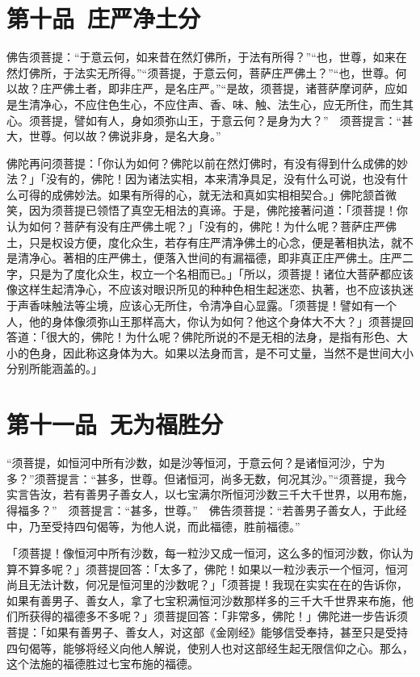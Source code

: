 \documentclass[12pt,twoside,openany]{book}
\newcommand{\kai}[1]{{\CJKfamily{kai}#1}}
\begin{document}
\chapter{第十品\ 庄严净土分}
\begin{pinyinscope}
佛告须菩提：“于意云何，如来昔在然灯佛所，于法有所得？”“也，世尊，如来在然灯佛所，于法实无所得。”“须菩提，于意云何，菩萨庄严佛土？”“也，世尊。何以故？庄严佛土者，即非庄严，是名庄严。”“是故，须菩提，诸菩萨摩诃萨，应如是生清净心，不应住色生心，不应住声、香、味、触、法生心，应无所住，而生其心。须菩提，譬如有人，身如须弥山王，于意云何？是身为大？”　须菩提言：“甚大，世尊。何以故？佛说非身，是名大身。”
\end{pinyinscope}

\kai{佛陀再问须菩提：「你认为如何？佛陀以前在然灯佛时，有没有得到什么成佛的妙法？」「没有的，佛陀！因为诸法实相，本来清净具足，没有什么可说，也没有什么可得的成佛妙法。如果有所得的心，就无法和真如实相相契合。」佛陀颔首微笑，因为须菩提已领悟了真空无相法的真谛。于是，佛陀接著问道：「须菩提！你认为如何？菩萨有没有庄严佛土呢？」「没有的，佛陀！为什么呢？菩萨庄严佛土，只是权设方便，度化众生，若存有庄严清净佛土的心念，便是著相执法，就不是清净心。著相的庄严佛土，便落入世间的有漏福德，即非真正庄严佛土。庄严二字，只是为了度化众生，权立一个名相而已。」「所以，须菩提！诸位大菩萨都应该像这样生起清净心，不应该对眼识所见的种种色相生起迷恋、执著，也不应该执迷于声香味触法等尘境，应该心无所住，令清净自心显露。「须菩提！譬如有一个人，他的身体像须弥山王那样高大，你认为如何？他这个身体大不大？」须菩提回答道：「很大的，佛陀！为什么呢？佛陀所说的不是无相的法身，是指有形色、大小的色身，因此称这身体为大。如果以法身而言，是不可丈量，当然不是世间大小分别所能涵盖的。」}

\chapter{第十一品\ 无为福胜分}
\begin{pinyinscope}
“须菩提，如恒河中所有沙数，如是沙等恒河，于意云何？是诸恒河沙，宁为多？”须菩提言：“甚多，世尊。但诸恒河，尚多无数，何况其沙。”“须菩提，我今实言告汝，若有善男子善女人，以七宝满尔所恒河沙数三千大千世界，以用布施，得福多？”　须菩提言：“甚多，世尊。”　佛告须菩提：“若善男子善女人，于此经中，乃至受持四句偈等，为他人说，而此福德，胜前福德。”
\end{pinyinscope}

\kai{「须菩提！像恒河中所有沙数，每一粒沙又成一恒河，这么多的恒河沙数，你认为算不算多呢？」须菩提回答：「太多了，佛陀！如果以一粒沙表示一个恒河，恒河尚且无法计数，何况是恒河里的沙数呢？」「须菩提！我现在实实在在的告诉你，如果有善男子、善女人，拿了七宝积满恒河沙数那样多的三千大千世界来布施，他们所获得的福德多不多呢？」须菩提回答：「非常多，佛陀！」佛陀进一步告诉须菩提：「如果有善男子、善女人，对这部《金刚经》能够信受奉持，甚至只是受持四句偈等，能够将经义向他人解说，使别人也对这部经生起无限信仰之心。那么，这个法施的福德胜过七宝布施的福德。
}
\end{document}

